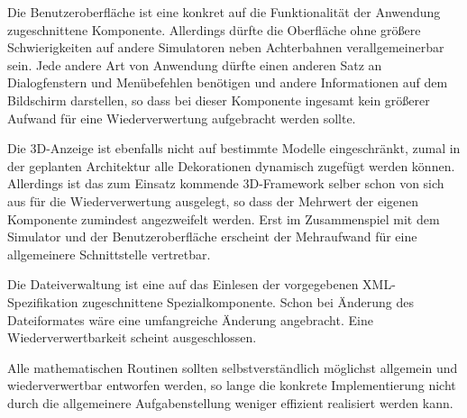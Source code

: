 Die Benutzeroberfläche ist eine konkret auf die Funktionalität der Anwendung
zugeschnittene Komponente. Allerdings dürfte die Oberfläche ohne größere
Schwierigkeiten auf andere Simulatoren neben Achterbahnen verallgemeinerbar sein.
Jede andere Art von Anwendung dürfte einen anderen Satz an Dialogfenstern und
Menübefehlen benötigen und andere Informationen auf dem Bildschirm darstellen,
so dass bei dieser Komponente ingesamt kein größerer Aufwand für eine
Wiederverwertung aufgebracht werden sollte.

Die 3D-Anzeige ist ebenfalls nicht auf bestimmte Modelle eingeschränkt, zumal in
der geplanten Architektur alle Dekorationen dynamisch zugefügt werden können.
Allerdings ist das zum Einsatz kommende 3D-Framework selber schon von sich aus 
für die Wiederverwertung ausgelegt, so dass der Mehrwert der eigenen Komponente
zumindest angezweifelt werden. Erst im Zusammenspiel mit dem Simulator und der 
Benutzeroberfläche erscheint der Mehraufwand für eine allgemeinere Schnittstelle
vertretbar.

Die Dateiverwaltung ist eine auf das Einlesen der vorgegebenen XML-Spezifikation 
zugeschnittene Spezialkomponente. Schon bei Änderung des Dateiformates wäre eine
umfangreiche Änderung angebracht. Eine Wiederverwertbarkeit scheint ausgeschlossen.

Alle mathematischen Routinen sollten selbstverständlich möglichst allgemein und
wiederverwertbar entworfen werden, so lange die konkrete Implementierung nicht
durch die allgemeinere Aufgabenstellung weniger effizient realisiert werden kann.
